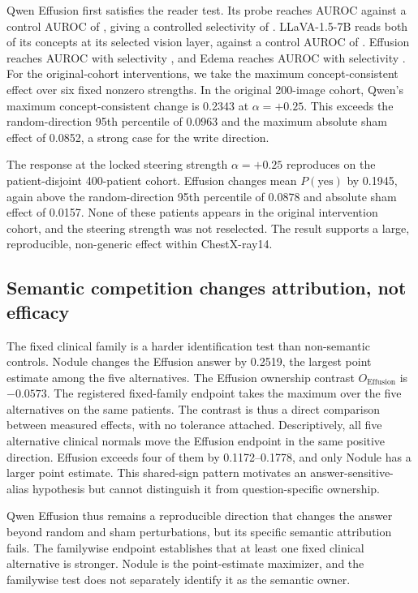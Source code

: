 \documentclass[11pt]{article}
\begin{document}
Qwen Effusion first satisfies the reader test. Its probe reaches AUROC \cfSeedDecQwenEffAuroc{} against a control AUROC of \cfSeedDecQwenEffCtrl{}, giving a controlled selectivity of \cfSeedDecQwenEffSel{}. LLaVA-1.5-7B reads both of its concepts at its selected vision layer, against a control AUROC of \cfSeedDecLlavaEffCtrl{}. Effusion reaches AUROC \cfSeedDecLlavaEffAuroc{} with selectivity \cfSeedDecLlavaEffSel{}, and Edema reaches AUROC \cfSeedDecLlavaEdemaAuroc{} with selectivity \cfSeedDecLlavaEdemaSel{}. For the original-cohort interventions, we take the maximum concept-consistent effect over six fixed nonzero strengths. In the original 200-image cohort, Qwen's maximum concept-consistent change is 0.2343 at $\alpha=+0.25$. This exceeds the random-direction 95th percentile of 0.0963 and the maximum absolute sham effect of 0.0852, a strong case for the write direction.

The response at the locked steering strength $\alpha=+0.25$ reproduces on the patient-disjoint 400-patient cohort. Effusion changes mean $P(\mathrm{yes})$ by 0.1945, again above the random-direction 95th percentile of 0.0878 and absolute sham effect of 0.0157. None of these patients appears in the original intervention cohort, and the steering strength was not reselected. The result supports a large, reproducible, non-generic effect within ChestX-ray14.


\subsection{Semantic competition changes attribution, not efficacy}
\label{sec:specificity-results}

The fixed clinical family is a harder identification test than non-semantic controls. Nodule changes the Effusion answer by 0.2519, the largest point estimate among the five alternatives. The Effusion ownership contrast $O_{\mathrm{Effusion}}$ is $-0.0573$. The registered fixed-family endpoint takes the maximum over the five alternatives on the same patients. The contrast is thus a direct comparison between measured effects, with no tolerance attached. Descriptively, all five alternative clinical normals move the Effusion endpoint in the same positive direction. Effusion exceeds four of them by 0.1172--0.1778, and only Nodule has a larger point estimate. This shared-sign pattern motivates an answer-sensitive-alias hypothesis but cannot distinguish it from question-specific ownership.

Qwen Effusion thus remains a reproducible direction that changes the answer beyond random and sham perturbations, but its specific semantic attribution fails. The familywise endpoint establishes that at least one fixed clinical alternative is stronger. Nodule is the point-estimate maximizer, and the familywise test does not separately identify it as the semantic owner.
\end{document}
